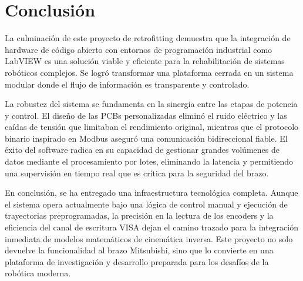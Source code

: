 \section{Conclusión}

La culminación de este proyecto de retrofitting demuestra que la integración de hardware de código abierto con entornos de programación industrial como LabVIEW es una solución viable y eficiente para la rehabilitación de sistemas robóticos complejos. Se logró transformar una plataforma cerrada en un sistema modular donde el flujo de información es transparente y controlado.

La robustez del sistema se fundamenta en la sinergia entre las etapas de potencia y control. El diseño de las PCBs personalizadas eliminó el ruido eléctrico y las caídas de tensión que limitaban el rendimiento original, mientras que el protocolo binario inspirado en Modbus aseguró una comunicación bidireccional fiable. El éxito del software radica en su capacidad de gestionar grandes volúmenes de datos mediante el procesamiento por lotes, eliminando la latencia y permitiendo una supervisión en tiempo real que es crítica para la seguridad del brazo.

En conclusión, se ha entregado una infraestructura tecnológica completa. Aunque el sistema opera actualmente bajo una lógica de control manual y ejecución de trayectorias preprogramadas, la precisión en la lectura de los encoders y la eficiencia del canal de escritura VISA dejan el camino trazado para la integración inmediata de modelos matemáticos de cinemática inversa. Este proyecto no solo devuelve la funcionalidad al brazo Mitsubishi, sino que lo convierte en una plataforma de investigación y desarrollo preparada para los desafíos de la robótica moderna.